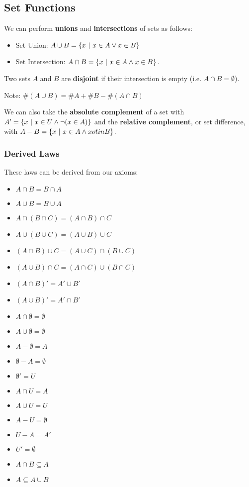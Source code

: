 \documentclass[12pt]{article}
\begin{document}
\subsection*{Set Functions}
We can perform {\bf unions} and {\bf intersections} of sets as follows:
\begin{itemize}
\item Set Union: $A \cup B = \{ x \ |\  x \in A \lor x \in B \}$
\item Set Intersection: $A \cap B = \{ x \ |\  x \in A \land x \in B \}$.
\end{itemize}

Two sets $A$ and $B$ are {\bf disjoint} if their intersection is empty (i.e. $A \cap B = \emptyset$).

Note: $\#(A \cup B) = \#A + \#B − \#(A \cap B)$

We can also take the {\bf absolute complement} of a set with $A' = \{ x \ |\  x \in U \land \neg(x \in A) \}$ and the {\bf relative complement}, or set difference, with $A - B = \{ x \ |\  x \in A \land x
otin B \}$.

\subsubsection*{Derived Laws}
These laws can be derived from our axioms:
\begin{itemize}
\item $A \cap B = B \cap A$
\item $A \cup B = B \cup A$
\item $A \cap (B \cap C) = (A \cap B) \cap C$
\item $A \cup (B \cup C) = (A \cup B) \cup C$
\item $(A \cap B) \cup C = (A \cup C) \cap (B \cup C)$
\item $(A \cup B) \cap C = (A \cap C) \cup (B \cap C)$
\item $(A \cap B)' = A' \cup B'$
\item $(A \cup B)' = A' \cap B'$
\item $A \cap \emptyset = \emptyset$
\item $A \cup \emptyset = \emptyset$
\item $A - \emptyset = A$
\item $\emptyset - A = \emptyset$
\item $\emptyset' = U$
\item $A \cap U = A$
\item $A \cup U = U$
\item $A - U = \emptyset$
\item $U - A = A'$
\item $U' = \emptyset$
\item $A \cap B \subseteq A$
\item $A \subseteq A \cup B$
\end{itemize}
\end{document}

